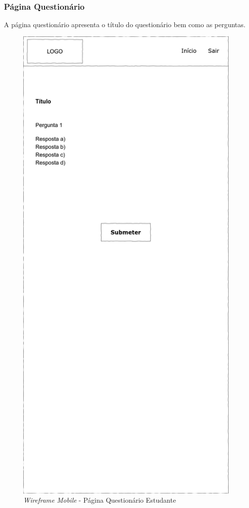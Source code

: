 \documentclass[12pt,a4paper,final]{article}
\begin{document}
    \subsubsection{Página Questionário}
    A página questionário apresenta o título do questionário bem como as perguntas.

    \begin{figure}[H]
        \centering
        \includegraphics[width=\textwidth,height=0.9\textheight,keepaspectratio]{wireframes/questionarios.wireframes-estudante-questionario-mobile.drawio}
        \caption{\textit{Wireframe Mobile} - Página Questionário Estudante}
        \label{fig:wm-pqe}
    \end{figure}
\end{document}

